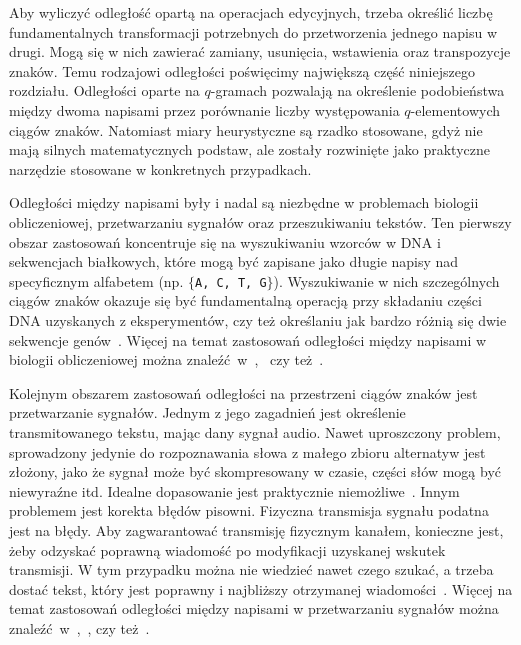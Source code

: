 \documentclass{praca1}
\begin{document}
Aby wyliczyć odległość opartą na operacjach edycyjnych, trzeba określić liczbę fundamentalnych transformacji potrzebnych do przetworzenia jednego napisu w drugi. Mogą się w nich zawierać zamiany, usunięcia, wstawienia oraz transpozycje znaków. Temu rodzajowi odległości poświęcimy największą część niniejszego rozdziału. Odległości oparte na $q$-gramach pozwalają na określenie podobieństwa między dwoma napisami przez porównanie liczby występowania $q$-elementowych ciągów znaków. Natomiast miary heurystyczne są rzadko stosowane, gdyż nie mają silnych matematycznych podstaw, ale zostały rozwinięte jako praktyczne narzędzie stosowane w konkretnych przypadkach. 

Odległości między napisami były i nadal są niezbędne w problemach biologii obliczeniowej, przetwarzaniu sygnałów oraz przeszukiwaniu tekstów. Ten pierwszy obszar zastosowań koncentruje się na wyszukiwaniu wzorców w DNA i sekwencjach białkowych, które mogą być zapisane jako długie napisy nad specyficznym alfabetem (np. $\{$\verb|A, C, T, G|$\}$). Wyszukiwanie w nich szczególnych ciągów znaków okazuje się być fundamentalną operacją przy składaniu części DNA uzyskanych z eksperymentów, czy też określaniu jak bardzo różnią się dwie sekwencje genów~\cite{Navarro2001:guidedtour}. Więcej na temat zastosowań odległości między napisami w biologii obliczeniowej można znaleźć~w~\cite{Sellers1980:evolutionary},~\cite{Needleman1970:proteins} czy też~\cite{Sankoff1983:timewarps}. 

Kolejnym obszarem zastosowań odległości na przestrzeni ciągów znaków jest przetwarzanie sygnałów. Jednym z jego zagadnień jest określenie transmitowanego tekstu, mając dany sygnał audio. Nawet uproszczony problem, sprowadzony jedynie do rozpoznawania słowa z małego zbioru alternatyw jest złożony, jako że sygnał może być skompresowany w czasie, części słów mogą być niewyraźne itd. Idealne dopasowanie jest praktycznie niemożliwe~\cite{Navarro2001:guidedtour}. Innym problemem jest korekta błędów pisowni. Fizyczna transmisja sygnału podatna jest na błędy. Aby zagwarantować transmisję fizycznym kanałem, konieczne jest, żeby odzyskać poprawną wiadomość po modyfikacji uzyskanej wskutek transmisji. W tym przypadku można nie wiedzieć nawet czego szukać, a trzeba dostać tekst, który jest poprawny i najbliższy otrzymanej wiadomości~\cite{Navarro2001:guidedtour}. Więcej na temat zastosowań odległości między napisami w przetwarzaniu sygnałów można znaleźć~w~\cite{Levenshtein1965:binarycodes},~\cite{Vintsyuk1968:speech}, czy też~\cite{Dixon1979:automatic}.
\end{document}

